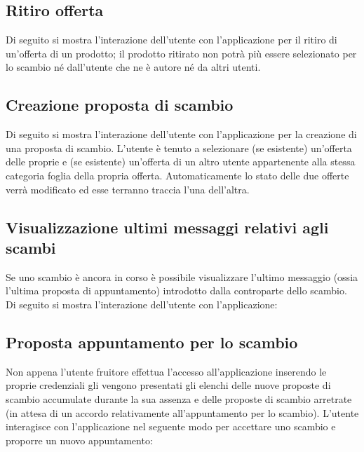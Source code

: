 \subsection{Ritiro offerta}
Di seguito si mostra l'interazione dell'utente con l'applicazione per il ritiro di un'offerta di un prodotto; il prodotto ritirato non potrà più essere selezionato per lo scambio né dall'utente che ne è autore né da altri utenti.


\subsection{Creazione proposta di scambio}
Di seguito si mostra l'interazione dell'utente con l'applicazione per la creazione di una proposta di scambio. 
L'utente è tenuto a selezionare (se esistente) un'offerta delle proprie e (se esistente) un'offerta di un altro utente appartenente alla stessa categoria foglia della propria offerta. 
Automaticamente lo stato delle due offerte verrà modificato ed esse terranno traccia l'una dell'altra.


\subsection{Visualizzazione ultimi messaggi relativi agli scambi}
Se uno scambio è ancora in corso è possibile visualizzare l'ultimo messaggio (ossia l'ultima proposta di appuntamento) introdotto dalla controparte dello scambio.
Di seguito si mostra l'interazione dell'utente con l'applicazione:


\subsection{Proposta appuntamento per lo scambio}
Non appena l'utente fruitore effettua l'accesso all'applicazione inserendo le proprie credenziali gli vengono presentati gli elenchi delle nuove proposte di scambio accumulate durante la sua assenza e delle proposte di scambio arretrate (in attesa di un accordo relativamente all'appuntamento per lo scambio). 
L'utente interagisce con l'applicazione nel seguente modo per accettare uno scambio e proporre un nuovo appuntamento:
